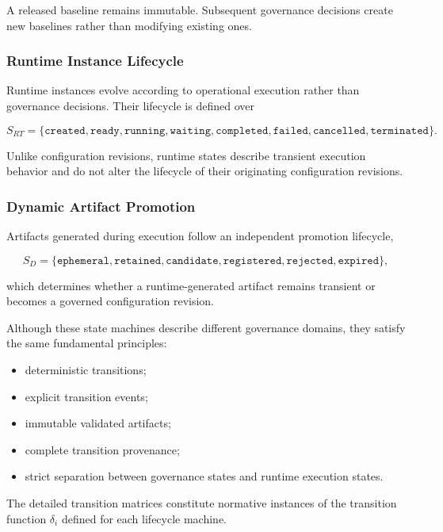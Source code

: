 \documentclass[10pt]{article}
\begin{document}
A released baseline remains immutable. Subsequent governance decisions create new baselines rather than modifying existing ones.

\subsubsection{Runtime Instance Lifecycle}

Runtime instances evolve according to operational execution rather than governance decisions. Their lifecycle is defined over

\[
S_{RT}=
\{
\texttt{created},
\texttt{ready},
\texttt{running},
\texttt{waiting},
\texttt{completed},
\texttt{failed},
\texttt{cancelled},
\texttt{terminated}
\}.
\]

Unlike configuration revisions, runtime states describe transient execution behavior and do not alter the lifecycle of their originating configuration revisions.

\subsubsection{Dynamic Artifact Promotion}

Artifacts generated during execution follow an independent promotion lifecycle,

\[
S_D=
\{
\texttt{ephemeral},
\texttt{retained},
\texttt{candidate},
\texttt{registered},
\texttt{rejected},
\texttt{expired}
\},
\]

which determines whether a runtime-generated artifact remains transient or becomes a governed configuration revision.

Although these state machines describe different governance domains, they satisfy the same fundamental principles:

\begin{itemize}
    \item deterministic transitions;
    \item explicit transition events;
    \item immutable validated artifacts;
    \item complete transition provenance;
    \item strict separation between governance states and runtime execution states.
\end{itemize}

The detailed transition matrices constitute normative instances of the transition function \(\delta_i\) defined for each lifecycle machine.
\end{document}

